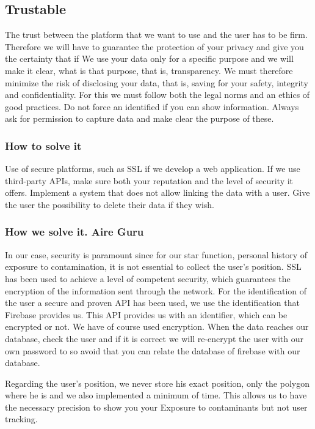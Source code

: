 \subsection{Trustable}
The trust between the platform that we want to use and the user has to be firm.
Therefore we will have to guarantee the protection of your privacy and give you the certainty that if
We use your data only for a specific purpose and we will make it clear,
what is that purpose, that is, transparency.
We must therefore minimize the risk of disclosing your data, that is, saving
for your safety, integrity and confidentiality.
For this we must follow both the legal norms and an ethics of good practices.
Do not force an identified if you can show information.
Always ask for permission to capture data and make clear the purpose of these.


\subsubsection{How to solve it} 
Use of secure platforms, such as SSL if we develop a web application.
If we use third-party APIs, make sure both your reputation and the level of security it offers.
Implement a system that does not allow linking the data with a user.
Give the user the possibility to delete their data if they wish.


\subsubsection{How we solve it. Aire Guru} 
In our case, security is paramount since for our star function, personal history
of exposure to contamination, it is not essential to collect the user's position.
SSL has been used to achieve a level of competent security, which guarantees the encryption of
the information sent through the network.
For the identification of the user a secure and proven API has been used, we use the identification
that Firebase provides us. This API provides us with an identifier, which can be encrypted or not.
We have of course used encryption. When the data reaches our database,
check the user and if it is correct we will re-encrypt the user with our own password to
so avoid that you can relate the database of firebase with our database.

Regarding the user's position, we never store his exact position, only the polygon where he is
and we also implemented a minimum of time. This allows us to have the necessary precision to show you your
Exposure to contaminants but not user tracking.

